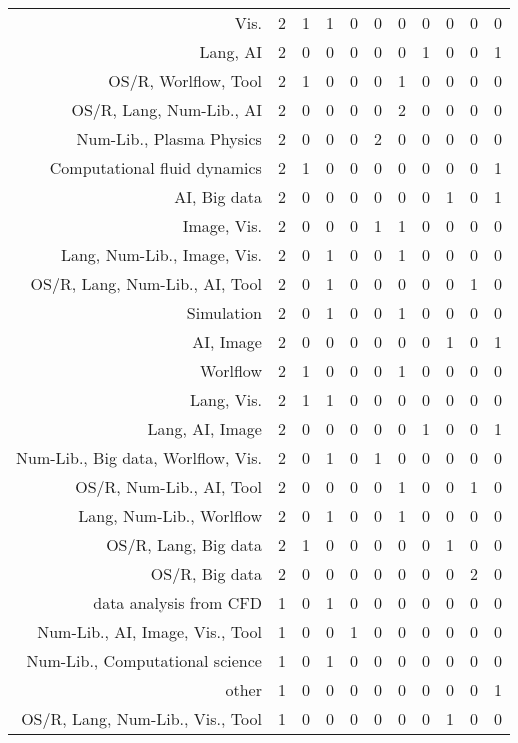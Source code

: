{\begin{landscape}
\begin{longtable}[htb]{r|c|c|c|c|c|c|c|c|c|c}
{Vis.} & 2 & 1 & 1 & 0 & 0 & 0 & 0 & 0 & 0 & 0 \\%
{Lang, AI} & 2 & 0 & 0 & 0 & 0 & 0 & 1 & 0 & 0 & 1 \\%
{OS/R, Worlflow, Tool} & 2 & 1 & 0 & 0 & 0 & 1 & 0 & 0 & 0 & 0 \\%
{OS/R, Lang, Num-Lib., AI} & 2 & 0 & 0 & 0 & 0 & 2 & 0 & 0 & 0 & 0 \\%
{Num-Lib., Plasma Physics} & 2 & 0 & 0 & 0 & 2 & 0 & 0 & 0 & 0 & 0 \\%
{Computational fluid dynamics} & 2 & 1 & 0 & 0 & 0 & 0 & 0 & 0 & 0 & 1 \\%
{AI, Big data} & 2 & 0 & 0 & 0 & 0 & 0 & 0 & 1 & 0 & 1 \\%
{Image, Vis.} & 2 & 0 & 0 & 0 & 1 & 1 & 0 & 0 & 0 & 0 \\%
{Lang, Num-Lib., Image, Vis.} & 2 & 0 & 1 & 0 & 0 & 1 & 0 & 0 & 0 & 0 \\%
{OS/R, Lang, Num-Lib., AI, Tool} & 2 & 0 & 1 & 0 & 0 & 0 & 0 & 0 & 1 & 0 \\%
{Simulation} & 2 & 0 & 1 & 0 & 0 & 1 & 0 & 0 & 0 & 0 \\%
{AI, Image} & 2 & 0 & 0 & 0 & 0 & 0 & 0 & 1 & 0 & 1 \\%
{Worlflow} & 2 & 1 & 0 & 0 & 0 & 1 & 0 & 0 & 0 & 0 \\%
{Lang, Vis.} & 2 & 1 & 1 & 0 & 0 & 0 & 0 & 0 & 0 & 0 \\%
{Lang, AI, Image} & 2 & 0 & 0 & 0 & 0 & 0 & 1 & 0 & 0 & 1 \\%
{Num-Lib., Big data, Worlflow, Vis.} & 2 & 0 & 1 & 0 & 1 & 0 & 0 & 0 & 0 & 0 \\%
{OS/R, Num-Lib., AI, Tool} & 2 & 0 & 0 & 0 & 0 & 1 & 0 & 0 & 1 & 0 \\%
{Lang, Num-Lib., Worlflow} & 2 & 0 & 1 & 0 & 0 & 1 & 0 & 0 & 0 & 0 \\%
{OS/R, Lang, Big data} & 2 & 1 & 0 & 0 & 0 & 0 & 0 & 1 & 0 & 0 \\%
{OS/R, Big data} & 2 & 0 & 0 & 0 & 0 & 0 & 0 & 0 & 2 & 0 \\%
{data analysis from CFD} & 1 & 0 & 1 & 0 & 0 & 0 & 0 & 0 & 0 & 0 \\%
{Num-Lib., AI, Image, Vis., Tool} & 1 & 0 & 0 & 1 & 0 & 0 & 0 & 0 & 0 & 0 \\%
{Num-Lib., Computational science} & 1 & 0 & 1 & 0 & 0 & 0 & 0 & 0 & 0 & 0 \\%
{other} & 1 & 0 & 0 & 0 & 0 & 0 & 0 & 0 & 0 & 1 \\%
{OS/R, Lang, Num-Lib., Vis., Tool} & 1 & 0 & 0 & 0 & 0 & 0 & 0 & 1 & 0 & 0 \\%

\end{longtable}
\end{landscape}}
